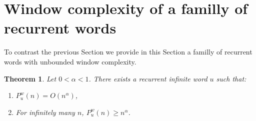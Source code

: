 \documentclass[a4 paper,12pt]{article}
\newtheorem{theorem}{Theorem}[section]
\begin{document}
\section{Window complexity of a  familly of recurrent words}

To contrast the previous Section   we provide in this Section a familly of recurrent words with unbounded window complexity.
\begin{theorem}


Let $0<\alpha<1$.  There exists a recurrent infinite word $u$ such that:
\begin{enumerate}
\item $P^{w}_{u}(n)=O(n^\alpha)$,
\item For infinitely many $n$, $P^{w}_{u}(n)\geq n^\alpha$.
\end{enumerate}
\end{theorem}
\end{document}
